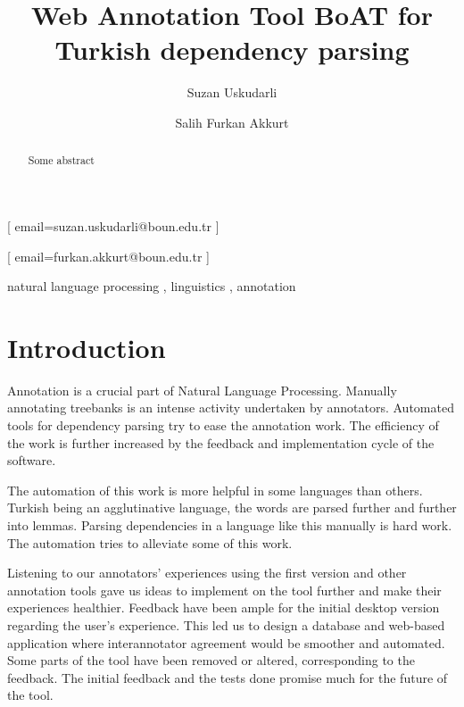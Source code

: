 \documentclass[
]{ceurart}
\begin{document}


\title{Web Annotation Tool BoAT for Turkish dependency parsing}

\author[1]{Suzan Uskudarli}[%
email=suzan.uskudarli@boun.edu.tr
]

\author[1]{Salih Furkan Akkurt}[%
email=furkan.akkurt@boun.edu.tr
]

\address[1]{ Department of Computer Engineering, Bogazici University, Bebek, 34342, İstanbul, Turkey }

\begin{abstract}
Some abstract
\end{abstract}

\begin{keywords}
natural language processing \sep
linguistics \sep
annotation
\end{keywords}

\maketitle

\section{Introduction}

Annotation is a crucial part of Natural Language Processing.
Manually annotating treebanks is an intense activity undertaken by annotators.
Automated tools for dependency parsing try to ease the annotation work.
The efficiency of the work is further increased by the feedback and implementation cycle of the software.

The automation of this work is more helpful in some languages than others.
Turkish being an agglutinative language, the words are parsed further and further into lemmas.
Parsing dependencies in a language like this manually is hard work.
The automation tries to alleviate some of this work.

Listening to our annotators' experiences using the first version and other annotation tools gave us ideas to implement on the tool further and make their experiences healthier.
Feedback have been ample for the initial desktop version regarding the user's experience.
This led us to design a database and web-based application where interannotator agreement would be smoother and automated.
Some parts of the tool have been removed or altered, corresponding to the feedback.
The initial feedback and the tests done promise much for the future of the tool.
\end{document}

